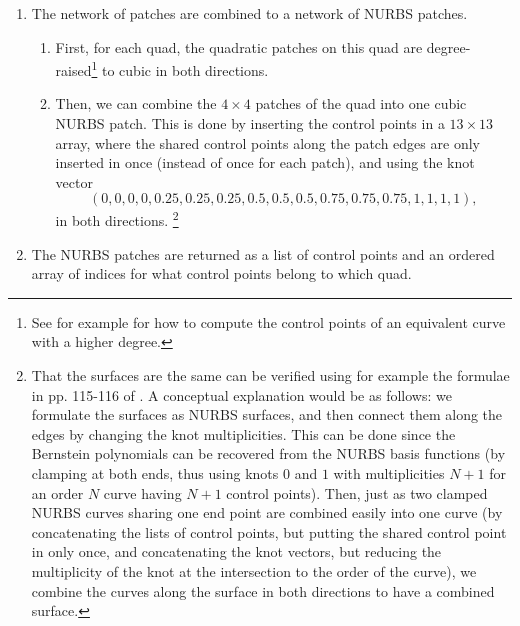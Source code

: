 \begin{enumerate}[resume]
\item The network of \Bez patches are combined to a network of NURBS patches.
\begin{enumerate} [label=(\alph*)]
\item First, for each quad, the quadratic \Bez patches on this quad are degree-raised\footnote{See for example \cite{bezDegRaise} for how to compute the control points of an equivalent \Bez curve with a higher degree.} to cubic in both directions.
\item Then, we can combine the $4\times4$ \Bez patches of the quad into one cubic NURBS patch. This is done by inserting the \Bez control points in a $13\times13$ array, where the shared control points along the \Bez patch edges are only inserted in once (instead of once for each \Bez patch), and using the knot vector 
$$(0, 0, 0, 0,0.25, 0.25, 0.25,0.5, 0.5, 0.5,0.75, 0.75, 0.75,1, 1, 1, 1),$$in both directions.%
%
\footnote{That the surfaces are the same can be verified using for example the formulae in pp. 115-116 of \cite{shikin1995handbook}. A conceptual explanation would be as follows: we formulate the \Bez surfaces as NURBS surfaces, and then connect them along the edges by changing the knot multiplicities. This can be done since the Bernstein polynomials can be recovered from the NURBS basis functions (by clamping at both ends, thus using knots $0$ and $1$ with multiplicities $N+1$ for an order $N$ curve having $N+1$ control points). Then, just as two clamped NURBS curves sharing one end point are combined easily into one curve (by concatenating the lists of control points, but putting the shared control point in only once, and concatenating the knot vectors, but reducing the multiplicity of the knot at the intersection to the order of the curve), we combine the curves along the surface in both directions to have a combined surface.}
%
\end{enumerate}
\item The NURBS patches are returned as a list of control points and an ordered array of indices for what control points belong to which quad.
\end{enumerate}

